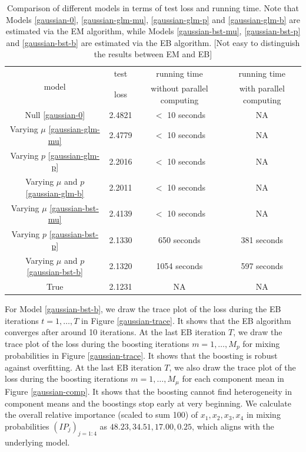 \documentclass[11pt]{article}
\numberwithin{equation}{section}
\begin{document}
\begin{table}[htp!]
	\caption{Comparison of different models in terms of test loss and running time. Note that Models \eqref{gaussian-0}, \eqref{gaussian-glm-mu}, \eqref{gaussian-glm-p} and \eqref{gaussian-glm-b} are estimated via the EM algorithm, while Models \eqref{gaussian-bst-mu}, \eqref{gaussian-bst-p} and \eqref{gaussian-bst-b} are estimated via the EB algorithm.  {\color{blue}[Not easy to distinguish the results between EM and EB]}}\label{gaussian-summary}
	\centering
	\begin{tabular}{c|ccc}
		\hline
		\multirow{2}{*}{model} & test       & running time               & running time            \\
		& loss & without parallel computing & with parallel computing \\ \hline
		Null \eqref{gaussian-0}                   & 2.4821         & $<$ 10 seconds       & NA    \\
		Varying $\mu$	\eqref{gaussian-glm-mu}                & 2.4779         & $<$ 10 seconds       & NA    \\
		Varying  $p$ \eqref{gaussian-glm-p}                 & 2.2016         & $<$ 10 seconds       & NA   \\
		Varying $\mu$ and $p$ \eqref{gaussian-glm-b}              & 2.2011         & $<$ 10 seconds       & NA   \\
		Varying $\mu$ \eqref{gaussian-bst-mu}                & 2.4139         & $<$ 10 seconds       & NA    \\
		Varying $p$ \eqref{gaussian-bst-p}                 & 2.1330          &            650 seconds                & 381 seconds           \\
		Varying $\mu$ and $p$ \eqref{gaussian-bst-b}              & 2.1320          &              1054 seconds              & 597 seconds               \\
		True                   & 2.1231         &            NA                &               NA         \\ \hline
	\end{tabular}
\end{table}

For Model \eqref{gaussian-bst-b}, we draw the trace plot of the loss during the EB iterations $t=1,\ldots,T$ in Figure \ref{gaussian-trace}.
It shows that the EB algorithm converges after around 10 iterations. 
At the last EB iteration $T$, we draw the trace plot of the loss during the boosting iterations $m=1,\ldots,M_p$ for mixing probabilities in Figure \ref{gaussian-trace}.
It shows that the boosting is robust against overfitting.
At the last EB iteration $T$, we also draw the trace plot of the loss during the boosting iterations $m=1,\ldots,M_\mu$ for each component mean in Figure \ref{gaussian-comp}.
It shows that the boosting cannot find heterogeneity in component means and the boostings stop early at very beginning. 
We calculate the overall relative importance (scaled to sum 100) of $x_1,x_2,x_3,x_4$ in mixing probabilities $(IP_j)_{j=1:4}$ as $48.23,34.51,17.00,0.25$, which aligns with the underlying model.
\end{document}
